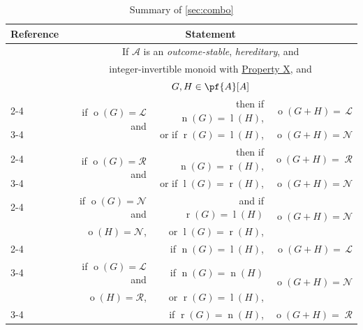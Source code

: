\documentclass[11pt]{article}
\theoremstyle{definition}
\DeclareMathOperator{\outcome}{o}
\newcommand{\set}[1]{\mathcal{#1}}
\DeclareMathOperator{\ltp}{l}
\DeclareMathOperator{\ntp}{n}
\DeclareMathOperator{\rtp}{r}
\begin{document}
\renewcommand{\arraystretch}{1.2}
\begin{table}
\caption{Summary of \cref{sec:combo}}
\vspace{3pt}
\centering
\begin{tabular}{l|rrr}
    \hline
    \rowcolor{gray!50} Reference & \multicolumn{3}{c}{Statement}  \\[2pt]
    \hline
    & \multicolumn{3}{c}{If $\set{A}$ is an \emph{outcome-stable},
    \emph{hereditary}, and} \\
    & \multicolumn{3}{c}{integer-invertible monoid with
    \hyperlink{prop:X}{Property X}, and} \\
    & \multicolumn{3}{c}{$G,H\in\pf{A}[A]$} \\
    \cmidrule(lr){2-4}
    \multirow{8}{*}{\cref{thm:final-piece}} &
    \multirow{2}{*}{if $\outcome(G)=\mathscr{L}$ and} & then if
    $\ntp(G)=\ltp(H)$, & 
    $\outcome(G+H)=\,\mathscr{L}$ \\
    \cmidrule(lr){3-4}
    & \multirow{1}{*}{$\outcome(H)=\mathscr{N}$,} & or if $\rtp(G)=\ltp(H)$,
    &
    $\outcome(G+H)=\mathscr{N}$ \\
    \cmidrule(lr){2-4}
    & \multirow{2}{*}{if $\outcome(G)=\mathscr{R}$ and} & then if
    $\ntp(G)=\rtp(H)$,
    & $\outcome(G+H)=\;\mathscr{R}$ \\
    \cmidrule(lr){3-4}
    & \multirow{1}{*}{$\outcome(H)=\mathscr{N}$,} & or if $\ltp(G)=\rtp(H)$,
    &
    $\outcome(G+H)=\mathscr{N}$ \\
    \cmidrule{2-4}
    & \multirow{1.3}{*}{if $\outcome(G)=\mathscr{N}$ and} & 
    \multirow{1.3}{*}{and if $\rtp(G)=\ltp(H)$} &
    \multirow{2}{*}{$\outcome(G+H)=\mathscr{N}$} \\
    & \multirow{1}{*}{$\outcome(H)=\mathscr{N}$,} & 
    \multirow{1}{*}{or $\ltp(G)=\rtp(H)$,} & \\
    \cmidrule{2-4}
    &  & if $\ntp(G)=\ltp(H)$, & 
    $\outcome(G+H)=\,\mathscr{L}$ \\
    \cmidrule(lr){3-4}
    & \multirow{1.5}{*}{if $\outcome(G)=\mathscr{L}$ and} & if
    $\ntp(G)=\ntp(H)$  &
    \multirow{2}{*}{$\outcome(G+H)=\mathscr{N}$} \\
    & \multirow{-1}{*}{$\outcome(H)=\mathscr{R}$,} & or $\rtp(G)=\ltp(H)$, & \\
    \cmidrule(lr){3-4}
    &  & if $\rtp(G)=\ntp(H)$, & $\outcome(G+H)=\;\mathscr{R}$ \\

    \hline
    \hline
\end{tabular}
\label{tab:combo}
\end{table}
\end{document}
